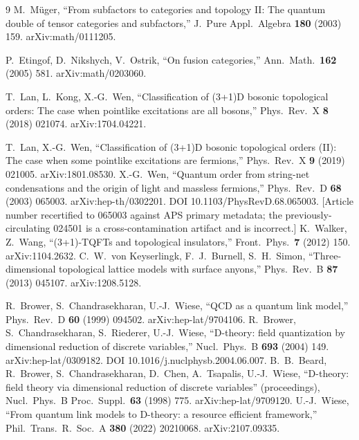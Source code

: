 \begin{thebibliography}{9}
M.~M\"uger, ``From subfactors to categories and topology II: The quantum double of tensor categories and subfactors,'' J.\ Pure Appl.\ Algebra \textbf{180} (2003) 159. arXiv:math/0111205.

P.~Etingof, D.~Nikshych, V.~Ostrik, ``On fusion categories,'' Ann.\ Math.\ \textbf{162} (2005) 581. arXiv:math/0203060.

T.~Lan, L.~Kong, X.-G.~Wen, ``Classification of (3+1)D bosonic topological orders: The case when pointlike excitations are all bosons,'' Phys.\ Rev.\ X \textbf{8} (2018) 021074. arXiv:1704.04221.

T.~Lan, X.-G.~Wen, ``Classification of (3+1)D bosonic topological orders (II): The case when some pointlike excitations are fermions,'' Phys.\ Rev.\ X \textbf{9} (2019) 021005. arXiv:1801.08530.
X.-G.~Wen, ``Quantum order from string-net condensations and the origin of light and massless fermions,'' Phys.\ Rev.\ D \textbf{68} (2003) 065003. arXiv:hep-th/0302201. DOI 10.1103/PhysRevD.68.065003. [Article number recertified to 065003 against APS primary metadata; the previously-circulating 024501 is a cross-contamination artifact and is incorrect.]
K.~Walker, Z.~Wang, ``(3+1)-TQFTs and topological insulators,'' Front.\ Phys.\ \textbf{7} (2012) 150. arXiv:1104.2632.
C.~W.~von Keyserlingk, F.~J.~Burnell, S.~H.~Simon, ``Three-dimensional topological lattice models with surface anyons,'' Phys.\ Rev.\ B \textbf{87} (2013) 045107. arXiv:1208.5128.

R.~Brower, S.~Chandrasekharan, U.-J.~Wiese, ``QCD as a quantum link model,'' Phys.\ Rev.\ D \textbf{60} (1999) 094502. arXiv:hep-lat/9704106.
R.~Brower, S.~Chandrasekharan, S.~Riederer, U.-J.~Wiese, ``D-theory: field quantization by dimensional reduction of discrete variables,'' Nucl.\ Phys.\ B \textbf{693} (2004) 149. arXiv:hep-lat/0309182. DOI 10.1016/j.nuclphysb.2004.06.007.
B.~B.~Beard, R.~Brower, S.~Chandrasekharan, D.~Chen, A.~Tsapalis, U.-J.~Wiese, ``D-theory: field theory via dimensional reduction of discrete variables'' (proceedings), Nucl.\ Phys.\ B Proc.\ Suppl.\ \textbf{63} (1998) 775. arXiv:hep-lat/9709120.
U.-J.~Wiese, ``From quantum link models to D-theory: a resource efficient framework,'' Phil.\ Trans.\ R.\ Soc.\ A \textbf{380} (2022) 20210068. arXiv:2107.09335.


\end{thebibliography}
